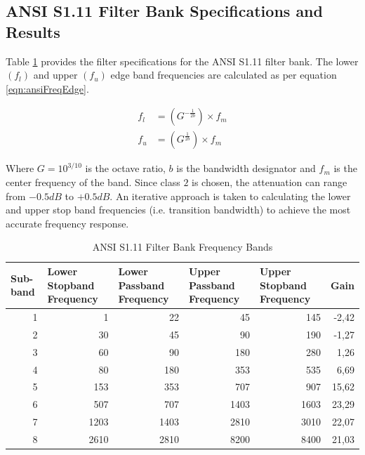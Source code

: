 \documentclass[12pt, onecolumn]{article}
\begin{document}
\begin{appendices}
\section{ANSI S1.11 Filter Bank Specifications and Results}
\label{app:ansiSpec}

\noindent Table \ref{tab:ansiFreqSpec} provides the filter specifications for the ANSI S1.11 filter bank. The lower $(f_l)$ and upper $(f_u)$ edge band frequencies are calculated as per equation \ref{eqn:ansiFreqEdge}.

\begin{equation}
\label{eqn:ansiFreqEdge}
\begin{aligned}
f_l &= (G^{-\frac{1}{2b}}) \times f_m \\
f_u &= (G^{\frac{1}{2b}}) \times f_m
\end{aligned}
\end{equation}

\noindent Where $G = 10^{3/10}$ is the octave ratio, $b$ is the bandwidth designator and $f_m$ is the center frequency of the band. Since class $2$ is chosen, the attenuation can range from $-0.5dB$ to $+0.5dB$. An iterative approach is taken to calculating the lower and upper stop band frequencies (i.e. transition bandwidth) to achieve the most accurate frequency response.	

\begin{table}[htbp]
  \centering
  \caption{ANSI S1.11 Filter Bank Frequency Bands}
  \begin{adjustbox}{width=0.9\linewidth}
    \begin{tabular}{|r|r|r|r|r|r|}
    \hline
    \multicolumn{1}{|l|}{\textbf{Sub-band}} & \multicolumn{1}{l|}{\textbf{Lower Stopband Frequency}} & \multicolumn{1}{l|}{\textbf{Lower Passband Frequency}} & \multicolumn{1}{l|}{\textbf{Upper Passband Frequency}} & \multicolumn{1}{l|}{\textbf{Upper Stopband Frequency}} & \multicolumn{1}{l|}{\textbf{Gain}} \\
    \hline
    1     & 1     & 22    & 45    & 145   & -2,42 \\
    \hline
    2     & 30    & 45    & 90    & 190   & -1,27 \\
    \hline
    3     & 60    & 90    & 180   & 280   & 1,26 \\
    \hline
    4     & 80    & 180   & 353   & 535   & 6,69 \\
    \hline
    5     & 153   & 353   & 707   & 907   & 15,62 \\
    \hline
    6     & 507   & 707   & 1403  & 1603  & 23,29 \\
    \hline
    7     & 1203  & 1403  & 2810  & 3010  & 22,07 \\
    \hline
    8     & 2610  & 2810  & 8200  & 8400  & 21,03 \\
    \hline
    \end{tabular}%
    \end{adjustbox}
  \label{tab:ansiFreqSpec}%
\end{table}%


\end{appendices}
\end{document}
